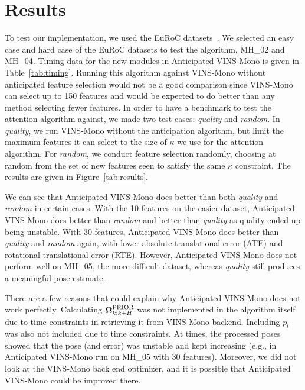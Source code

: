 
\section{Results}\label{sec:results}

To test our implementation, we used the EuRoC datasets~\cite{Burri2016}.
We selected an easy case and hard case of the EuRoC datasets to test the algorithm, MH\_02 and MH\_04.
Timing data for the new modules in Anticipated VINS-Mono is given in Table~\ref{tab:timing}.
Running this algorithm against VINS-Mono without anticipated feature selection would not be a good comparison since VINS-Mono can select up to 150 features and would be expected to do better than any method selecting fewer features.
In order to have a benchmark to test the attention algorithm against, we made two test cases: \textit{quality} and \textit{random}.
In \textit{quality}, we run VINS-Mono without the anticipation algorithm, but limit the maximum features it can select to the size of $\kappa$ we use for the attention algorithm.
For \textit{random}, we conduct feature selection randomly, choosing at random from the set of new features seen to satisfy the same $\kappa$ constraint.
The results are given in Figure~\ref{tab:results}.

We can see that Anticipated VINS-Mono does better than both \textit{quality} and \textit{random} in certain cases.
With the 10 features on the easier dataset, Anticipated VINS-Mono does better than \textit{random} and better than \textit{quality} as quality ended up being unstable.
With 30 features, Anticipated VINS-Mono does better than \textit{quality} and \textit{random} again, with lower absolute translational error (ATE) and rotational translational error (RTE).
However, Anticipated VINS-Mono does not perform well on MH\_05, the more difficult dataset, whereas \textit{quality} still produces a meaningful pose estimate.

There are a few reasons that could explain why Anticipated VINS-Mono does not work perfectly.
Calculating ${\boldsymbol \Omega}_{k:k+H}^\text{PRIOR}$ was not implemented in the algorithm itself due to time constraints in retrieving it from VINS-Mono backend.
Including $p_l$ was also not included due to time constraints.
At times, the processed poses showed that the pose (and error) was unstable and kept increasing (e.g., in Anticipated VINS-Mono run on MH\_05 with 30 features).
Moreover, we did not look at the VINS-Mono back end optimizer, and it is possible that Anticipated VINS-Mono could be improved there.

